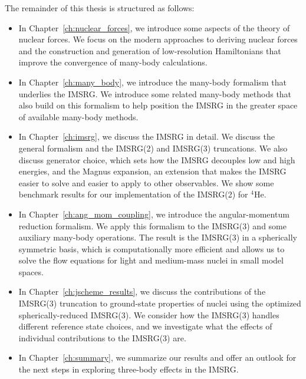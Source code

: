 The remainder of this thesis is structured as follows:
\begin{itemize}
  \item{In Chapter~\ref{ch:nuclear_forces},
        we introduce some aspects of the theory of nuclear forces.
        We focus on the modern approaches to deriving nuclear forces
        and
        the construction and generation of low-resolution Hamiltonians
        that improve the convergence of many-body calculations.}
  \item{In Chapter~\ref{ch:many_body},
        we introduce the many-body formalism that underlies the IMSRG.\@
        We introduce some related many-body methods that also build on this formalism
        to help position the IMSRG in the greater space of available many-body methods.}
  \item{In Chapter~\ref{ch:imsrg},
        we discuss the IMSRG in detail.
        We discuss the general formalism and the IMSRG(2) and IMSRG(3) truncations.
        We also discuss generator choice,
        which sets how the IMSRG decouples low and high energies,
        and the Magnus expansion,
        an extension that makes the IMSRG easier to solve and easier to apply to other observables.
        We show some benchmark results for our implementation of the IMSRG(2) for ${}^4\text{He}$.}
  \item{In Chapter~\ref{ch:ang_mom_coupling},
        we introduce the angular-momentum reduction formalism.
        We apply this formalism to the IMSRG(3)
        and some auxiliary many-body operations.
        The result is the IMSRG(3) in a spherically symmetric basis,
        which is computationally more efficient
        and allows us to solve the flow equations
        for light and medium-mass nuclei in small model spaces.}
  \item{In Chapter~\ref{ch:jscheme_results},
        we discuss the contributions of the IMSRG(3) truncation
        to ground-state properties of nuclei
        using the optimized spherically-reduced IMSRG(3).
        We consider how the IMSRG(3) handles different reference state choices,
        and we investigate what the effects of individual contributions to the IMSRG(3) are.}
  \item{In Chapter~\ref{ch:summary},
        we summarize our results
        and offer an outlook for the next steps
        in exploring three-body effects in the IMSRG.}
\end{itemize}
